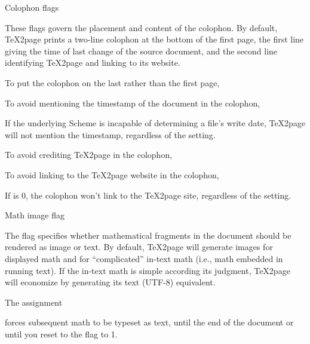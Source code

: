 \beginsection Colophon flags

These flags
govern the placement and content of the colophon.
By default, \TeX2page prints a two-line colophon at the
bottom of the first page, the first line giving
the time of last change of the source document, and the
second line identifying \TeX2page and linking to its website.

To put the colophon on the last rather than the first page,


\iffalse
\n If this request is to have meaning, it should be made in the document
before the text for the second HTML page starts.  Otherwise, the default
first-page placement of the colophon will have already taken effect.
\fi

To avoid mentioning the timestamp of the document in the
colophon,


\n If the underlying
Scheme is incapable of determining a file's write date, \TeX2page will
not mention the timestamp, regardless of the \p{\TZPcolophontimestamp} setting.

To avoid crediting \TeX2page in the colophon,


To avoid linking to the \TeX2page website in the colophon,


\n If \p{\TZPcolophoncredit} is 0, the colophon won't link to the \TeX2page
site, regardless of the \p{\TZPcolophonweblink} setting.

\beginsection Math image flag

The \p{\TZPmathimage} flag
specifies whether mathematical fragments in the
document should be rendered as image or text.  By default, \TeX2page will
generate images for displayed math and for ``complicated''
in-text math (i.e., math embedded in running text).   If the
in-text math is simple according its judgment, \TeX2page will
economize by generating its text (UTF-8) equivalent.

The assignment

forces subsequent math to be typeset as text, until the end of the document or
until you reset to the flag to 1.

